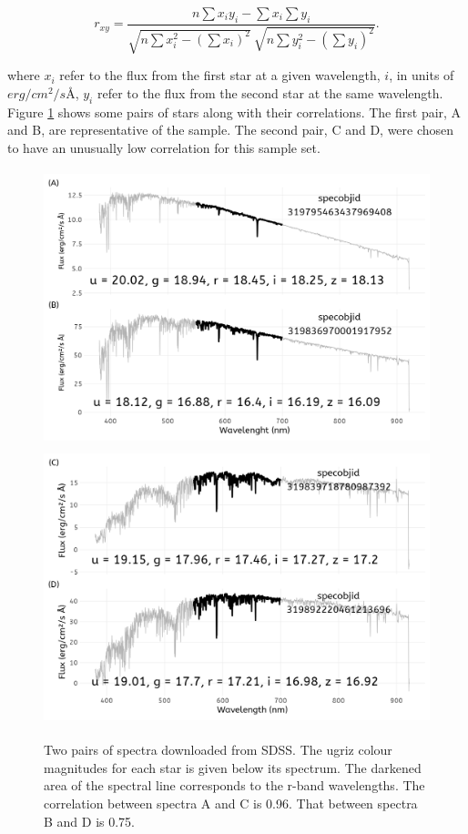 \documentclass[preprint, 3p,
authoryear]{elsarticle} %
\begin{document}
\begin{equation}
  \displaystyle r_{xy}={\frac {n\sum x_{i}y_{i}-\sum x_{i}\sum y_{i}}{{\sqrt {n\sum x_{i}^{2}-\left(\sum x_{i}\right)^{2}}}~{\sqrt {n\sum y_{i}^{2}-\left(\sum y_{i}\right)^{2}}}}}.
  \label{eq:correlation}
\end{equation}

where \(x_i\) refer to the flux from the first star at a given
wavelength, \(i\), in units of \(erg/cm^2/s Å\), \(y_i\) refer to the
flux from the second star at the same wavelength. Figure
\ref{fig:spectra} shows some pairs of stars along with their
correlations. The first pair, A and B, are representative of the sample.
The second pair, C and D, were chosen to have an unusually low
correlation for this sample set.

\begin{figure}
  \includegraphics[width=\columnwidth, height = 8cm]{figures/spectra1}
  \includegraphics[width=\columnwidth, height = 8cm]{figures/spectra2}
    \caption{Two pairs of spectra downloaded from SDSS. The ugriz colour magnitudes for each star is given below its spectrum. The darkened area of the spectral line corresponds to the r-band wavelengths. The correlation between spectra A and C is 0.96. That between spectra B and D is 0.75.}
    \label{fig:spectra}
\end{figure}
\end{document}
